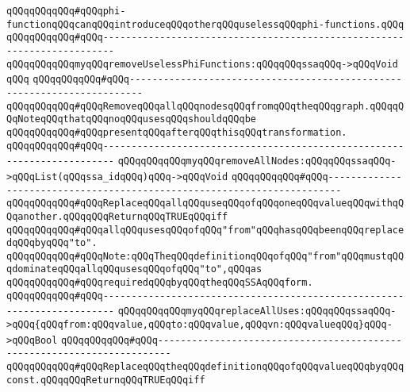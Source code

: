 \verb|qQQqqQQqqQQq#qQQqphi-functionqQQqcanqQQqintroduceqQQqotherqQQquselessqQQqphi-functions.qQQq|\newline
\verb|qQQqqQQqqQQq#qQQq------------------------------------------------------------------------|\newline
\verb|qQQqqQQqqQQqmyqQQqremoveUselessPhiFunctions:qQQqqQQqssaqQQq->qQQqVoid|\newline
\verb|qQQq|\newline
\verb|qQQqqQQqqQQq#qQQq------------------------------------------------------------------------|\newline
\verb|qQQqqQQqqQQq#qQQqRemoveqQQqallqQQqnodesqQQqfromqQQqtheqQQqgraph.qQQqqQQqNoteqQQqthatqQQqnoqQQqusesqQQqshouldqQQqbe|\newline
\verb|qQQqqQQqqQQq#qQQqpresentqQQqafterqQQqthisqQQqtransformation.|\newline
\verb|qQQqqQQqqQQq#qQQq------------------------------------------------------------------------|\newline
\verb|qQQqqQQqqQQqmyqQQqremoveAllNodes:qQQqqQQqssaqQQq->qQQqList(qQQqssa_idqQQq)qQQq->qQQqVoid|\newline
\newline
\verb|qQQqqQQqqQQq#qQQq------------------------------------------------------------------------|\newline
\verb|qQQqqQQqqQQq#qQQqReplaceqQQqallqQQquseqQQqofqQQqoneqQQqvalueqQQqwithqQQqanother.qQQqqQQqReturnqQQqTRUEqQQqiff|\newline
\verb|qQQqqQQqqQQq#qQQqallqQQqusesqQQqofqQQq"from"qQQqhasqQQqbeenqQQqreplacedqQQqbyqQQq"to".|\newline
\verb|qQQqqQQqqQQq#qQQqNote:qQQqTheqQQqdefinitionqQQqofqQQq"from"qQQqmustqQQqdominateqQQqallqQQqusesqQQqofqQQq"to",qQQqas|\newline
\verb|qQQqqQQqqQQq#qQQqrequiredqQQqbyqQQqtheqQQqSSAqQQqform.|\newline
\verb|qQQqqQQqqQQq#qQQq------------------------------------------------------------------------|\newline
\verb|qQQqqQQqqQQqmyqQQqreplaceAllUses:qQQqqQQqssaqQQq->qQQq{qQQqfrom:qQQqvalue,qQQqto:qQQqvalue,qQQqvn:qQQqvalueqQQq}qQQq->qQQqBool|\newline
\newline
\verb|qQQqqQQqqQQq#qQQq------------------------------------------------------------------------|\newline
\verb|qQQqqQQqqQQq#qQQqReplaceqQQqtheqQQqdefinitionqQQqofqQQqvalueqQQqbyqQQqconst.qQQqqQQqReturnqQQqTRUEqQQqiff|\newline

